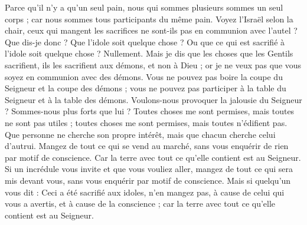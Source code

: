 \begin{multicols}{2}
Parce qu'il n'y a qu'un seul pain, nous qui sommes plusieurs sommes un seul corps ; car nous sommes tous participants du même pain.
Voyez l'Israël selon la chair, ceux qui mangent les sacrifices ne sont-ils pas en communion avec l'autel ?
Que dis-je donc ? Que l'idole soit quelque chose ? Ou que ce qui est sacrifié à l'idole soit quelque chose ? Nullement.
Mais je dis que les choses que les Gentils sacrifient, ils les sacrifient aux démons, et non à Dieu ; or je ne veux pas que vous soyez en communion avec des démons.
Vous ne pouvez pas boire la coupe du Seigneur et la coupe des démons ; vous ne pouvez pas participer à la table du Seigneur et à la table des démons.
Voulons-nous provoquer la jalousie du Seigneur ? Sommes-nous plus forts que lui ?
Toutes choses me sont permises, mais toutes ne sont pas utiles ; toutes choses me sont permises, mais toutes n'édifient pas.
Que personne ne cherche son propre intérêt, mais que chacun cherche celui d’autrui.
Mangez de tout ce qui se vend au marché, sans vous enquérir de rien par motif de conscience.
Car la terre avec tout ce qu'elle contient est au Seigneur.
Si un incrédule vous invite et que vous vouliez aller, mangez de tout ce qui sera mis devant vous, sans vous enquérir par motif de conscience.
Mais si quelqu'un vous dit : Ceci a été sacrifié aux idoles, n'en mangez pas, à cause de celui qui vous a avertis, et à cause de la conscience ; car la terre avec tout ce qu'elle contient est au Seigneur.

\end{multicols}
